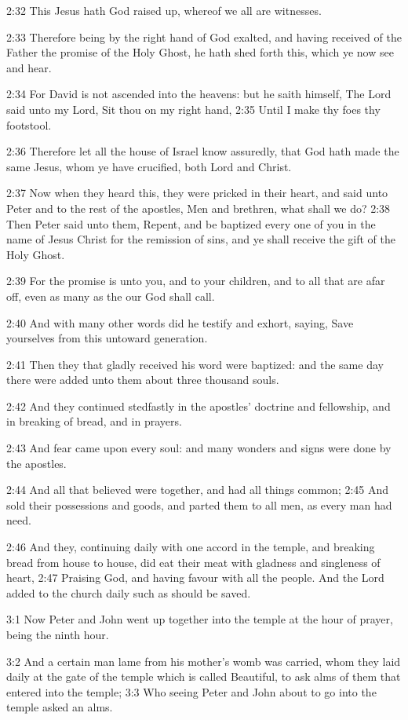2:32 This Jesus hath God raised up, whereof we all are witnesses.

2:33 Therefore being by the right hand of God exalted, and having
received of the Father the promise of the Holy Ghost, he hath shed
forth this, which ye now see and hear.

2:34 For David is not ascended into the heavens: but he saith himself,
The Lord said unto my Lord, Sit thou on my right hand, 2:35 Until I
make thy foes thy footstool.

2:36 Therefore let all the house of Israel know assuredly, that God
hath made the same Jesus, whom ye have crucified, both Lord and
Christ.

2:37 Now when they heard this, they were pricked in their heart, and
said unto Peter and to the rest of the apostles, Men and brethren,
what shall we do?  2:38 Then Peter said unto them, Repent, and be
baptized every one of you in the name of Jesus Christ for the
remission of sins, and ye shall receive the gift of the Holy Ghost.

2:39 For the promise is unto you, and to your children, and to all
that are afar off, even as many as the \LORD our God shall call.

2:40 And with many other words did he testify and exhort, saying, Save
yourselves from this untoward generation.

2:41 Then they that gladly received his word were baptized: and the
same day there were added unto them about three thousand souls.

2:42 And they continued stedfastly in the apostles' doctrine and
fellowship, and in breaking of bread, and in prayers.

2:43 And fear came upon every soul: and many wonders and signs were
done by the apostles.

2:44 And all that believed were together, and had all things common;
2:45 And sold their possessions and goods, and parted them to all men,
as every man had need.

2:46 And they, continuing daily with one accord in the temple, and
breaking bread from house to house, did eat their meat with gladness
and singleness of heart, 2:47 Praising God, and having favour with all
the people. And the Lord added to the church daily such as should be
saved.

3:1 Now Peter and John went up together into the temple at the hour of
prayer, being the ninth hour.

3:2 And a certain man lame from his mother's womb was carried, whom
they laid daily at the gate of the temple which is called Beautiful,
to ask alms of them that entered into the temple; 3:3 Who seeing Peter
and John about to go into the temple asked an alms.

